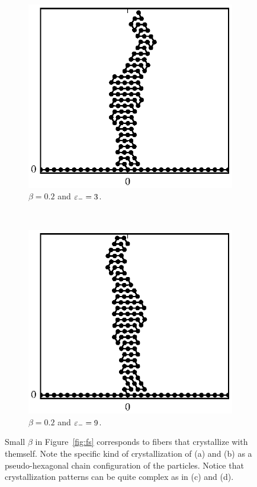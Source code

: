 \begin{figure}[h!]
		\begin{subfigure}{.5\textwidth}
			\centering
			\includegraphics{./fig/ch3/fs/b0.2_eb3.eps}
			\caption{$\beta=0.2$ and $\varepsilon_-=3$.\label{subfig:crystal1}}
		\end{subfigure}%
		~
		\begin{subfigure}{.5\textwidth}
			\centering
			\includegraphics{./fig/ch3/fs/b0.2_eb9.eps}
			\caption{$\beta=0.2$ and $\varepsilon_-=9$.\label{subfig:crystal2}}
		\end{subfigure}	
		\caption{Small $\beta$ in Figure~\ref{fig:fs} corresponds to fibers that crystallize with themself. Note the specific kind of crystallization of (a) and (b) as a pseudo-hexagonal chain configuration of the particles. Notice that crystallization patterns can be quite complex as in (c) and (d).\label{fig:crystal}}	
	\end{figure}


